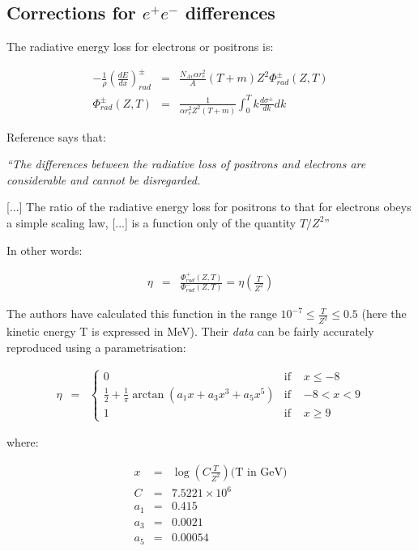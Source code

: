 \subsection{Corrections for $e^+ e^-$ differences}

The radiative energy loss for electrons or positrons is:

\begin{eqnarray*}
-\frac{1}{\rho} \left ( \frac{dE}{dx} \right )_{rad}^{\pm} & = &
\frac{N_{Av} \alpha r_e^2}{A} (T+m) Z^2 \Phi_{rad}^{\pm}(Z,T) \\
\Phi^{\pm}_{rad}(Z,T) & = & \frac{1}{\alpha r_{e}^2 Z^2 (T+m)}
\int^{T}_{0}{k\frac{d\sigma^{\pm}}{dk}dk}
\end{eqnarray*}

Reference \cite{ebrem.kim} says that: \\
{\it ``The differences between the radiative loss of positrons
and electrons are considerable and cannot be disregarded.

[...] The ratio of the radiative energy loss for positrons
to that for electrons obeys a simple scaling law, [...] is a
function only of the quantity $T/Z^2$''}

In other words:

\begin{eqnarray*}
\eta & = & \frac{\Phi_{rad}^{+}(Z,T)}{\Phi_{rad}^{-}(Z,T)} =
\eta \left (\frac{T}{Z^2}\right )
\end{eqnarray*}

The authors have calculated this function in the range $10^{-7}
\leq \frac{T}{Z^2} \leq 0.5$ (here the kinetic energy T is
expressed in MeV). Their {\it data} can be fairly accurately
reproduced using a parametrisation:

\begin{eqnarray*}
\eta & = & \left \{
\begin{array}{llr}
0 & \mbox{if   } & x \leq -8 \\
\frac{1}{2} + \frac{1}{\pi} \arctan \left( a_1 x + a_3 x^3
+ a_5 x^5 \right ) & \mbox{if  } & -8 < x < 9 \\
1 & \mbox{if   } & x \geq 9
\end{array}
\right .
\end{eqnarray*}

where:

\begin{eqnarray*}
x & = & \log \left ( C \frac{T}{Z^2} \right ) \mbox{(T in GeV)} \\
C & = & 7.5221 \times 10^{6} \\
a_1 & = & 0.415 \\
a_3 & = & 0.0021 \\
a_5 & = & 0.00054
\end{eqnarray*}

